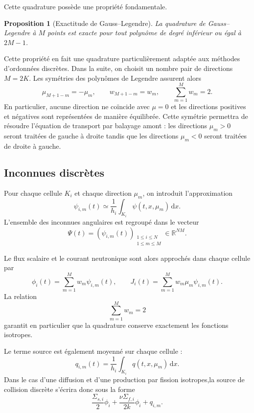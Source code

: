 \documentclass{article}
\newtheorem{proposition}[theorem]{Proposition}
\begin{document}
Cette quadrature possède une propriété fondamentale. 

\begin{proposition}[Exactitude de Gauss--Legendre] 
    La quadrature de Gauss--Legendre à $M$ points est exacte pour tout polynôme de degré inférieur ou égal à $2M-1$. \end{proposition} 
    
Cette propriété en fait une quadrature particulièrement adaptée aux méthodes d'ordonnées discrètes. Dans la suite, on choisit un nombre pair de directions $M=2K$. Les symétries des polynômes de Legendre assurent alors 
\[ 
\mu_{M+1-m}=-\mu_m, \qquad w_{M+1-m}=w_m, \qquad \sum_{m=1}^{M} w_m =2. 
\] 
En particulier, aucune direction ne coïncide avec $\mu=0$ et les directions positives et négatives sont représentées de manière équilibrée. Cette symétrie permettra de résoudre l'équation de transport par balayage amont : les directions $\mu_m>0$ seront traitées de gauche à droite tandis que les directions $\mu_m<0$ seront traitées de droite à gauche.

\subsection {Inconnues discrètes}

Pour chaque cellule $K_i$ et chaque direction $\mu_m$, on introduit
l'approximation
\[
    \psi_{i,m}(t)
    \simeq
    \frac{1}{h_i}
    \int_{K_i}\psi(t,x,\mu_m)\,\mathrm{d}x.
\]
L'ensemble des inconnues angulaires est regroupé dans le vecteur
\[
    \Psi(t)
    =
    \left(\psi_{i,m}(t)\right)_{
        \substack{1\leq i\leq N\\1\leq m\leq M}
    }
    \in\mathbb{R}^{NM}.
\]

Le flux scalaire et le courant neutronique sont alors approchés dans
chaque cellule par
\begin{equation}
    \phi_i(t) = \sum_{m=1}^{M}w_m\psi_{i,m}(t),
    \qquad
    J_i(t) = \sum_{m=1}^{M}w_m\mu_m\psi_{i,m}(t).
    \label{eq:moments-discrets}
\end{equation}
La relation
\[
    \sum_{m=1}^{M}w_m=2
\]
garantit en particulier que la quadrature conserve exactement les fonctions isotropes.

Le terme source est également moyenné sur chaque cellule :
\[
    q_{i,m}(t)
    =
    \frac{1}{h_i}
    \int_{K_i}q(t,x,\mu_m)\,\mathrm{d}x.
\]
Dans le cas d'une diffusion et d'une production par fission isotropes,la source de collision discrète s'écrira donc sous la forme
\[
    \frac{\Sigma_{s,i}}{2}\phi_i
    + \frac{\nu\Sigma_{f,i}}{2k}\phi_i + q_{i,m}.
\]
\end{document}
